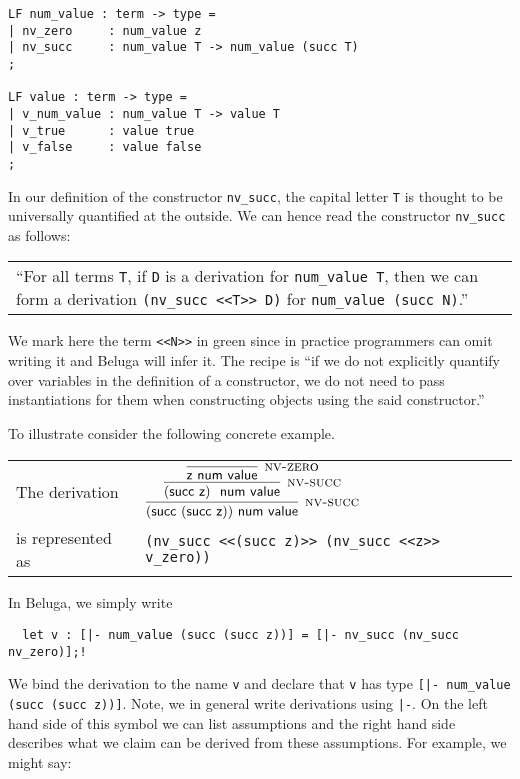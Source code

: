 \begin{lstlisting}
LF num_value : term -> type =
| nv_zero     : num_value z
| nv_succ     : num_value T -> num_value (succ T)
;

LF value : term -> type =
| v_num_value : num_value T -> value T
| v_true      : value true
| v_false     : value false
;
\end{lstlisting}

In our definition  of  the constructor \lstinline!nv_succ!, the  capital  letter
\lstinline!T! is thought  to be  universally quantified  at the outside.  We can
hence read the constructor \lstinline!nv_succ! as follows:

\begin{center}
\begin{tabular}{p{12cm}}
``For  all  terms   \lstinline$T$,   if   \lstinline!D!  is  a  derivation   for
\lstinline!num_value T!,      then      we     can     form     a     derivation
\lstinline!(nv_succ <<T>> D)! for \lstinline!num_value (succ N)!.''
\end{tabular}
\end{center}


We mark here  the term \lstinline!<<N>>! in green  since in practice programmers
can omit  writing it  and Beluga  will  infer it.  The recipe is  ``if we do not
explicitly quantify over variables in the definition of a constructor, we do not
need  to pass instantiations  for them when constructing objects  using the said
constructor.''

To illustrate consider the following concrete example.\\[1em]

\begin{tabular}{l@{\qquad}l}
The derivation &
$
\infer[\NVSucc]
  { (\tmsucc (\tmsucc \tmzero)) \NumValue }
  { \infer[\NVSucc]
      { (\tmsucc \tmzero)~\NumValue }
      { \infer[\NVZero]
          {\tmzero \NumValue}
          {}
      }
  }
$\\[1em]
is represented as &
\lstinline!(nv_succ <<(succ z)>> (nv_succ <<z>> v_zero))!\\[1em]
\end{tabular}

In Beluga, we simply write
\begin{lstlisting}
  let v : [|- num_value (succ (succ z))] = [|- nv_succ (nv_succ nv_zero)];!
\end{lstlisting}

We bind the derivation to the name \lstinline!v!  and declare that \lstinline!v!
has type \lstinline![|- num_value (succ (succ z))]!.  Note,  we in general write
derivations using \lstinline!|-!.  On the left hand side  of this symbol  we can
list assumptions and the right hand side describes  what we claim can be derived
from these assumptions.  For example, we might say:

